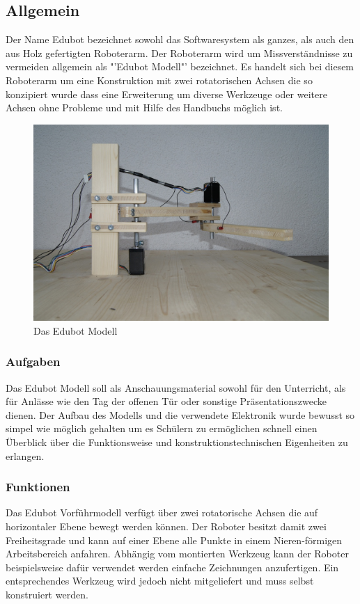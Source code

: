 \subsection{Allgemein}            
Der Name Edubot bezeichnet sowohl das Softwaresystem als ganzes, als auch den aus Holz gefertigten Roboterarm. Der Roboterarm wird um Missverständnisse zu vermeiden allgemein als "'Edubot Modell"' bezeichnet. Es handelt sich bei diesem Roboterarm um eine Konstruktion mit zwei rotatorischen Achsen die so konzipiert wurde dass eine Erweiterung um diverse Werkzeuge oder weitere Achsen ohne Probleme und mit Hilfe des Handbuchs möglich ist. 

\begin{figure}[H]
  \centering
  \begin{minipage}[t]{12 cm}
  	\centering
  	\includegraphics[width=12cm]{images/edubot_photo} 
    \caption{Das Edubot Modell}
  \end{minipage}
\end{figure}

\subsubsection{Aufgaben}
Das Edubot Modell soll als Anschauungsmaterial sowohl für den Unterricht, als für Anlässe wie den Tag der offenen Tür oder sonstige Präsentationszwecke dienen. Der Aufbau des Modells und die verwendete Elektronik wurde bewusst so simpel wie möglich gehalten um es Schülern zu ermöglichen schnell einen Überblick über die Funktionsweise und konstruktionstechnischen Eigenheiten zu erlangen.

\subsubsection{Funktionen}
Das Edubot Vorführmodell verfügt über zwei rotatorische Achsen die auf horizontaler Ebene bewegt werden können. 
Der Roboter besitzt damit zwei Freiheitsgrade und kann auf einer Ebene alle Punkte in einem Nieren-förmigen Arbeitsbereich anfahren. Abhängig vom montierten Werkzeug kann der Roboter beispielsweise dafür verwendet werden einfache Zeichnungen anzufertigen. Ein entsprechendes Werkzeug wird jedoch nicht mitgeliefert und muss selbst konstruiert werden.

